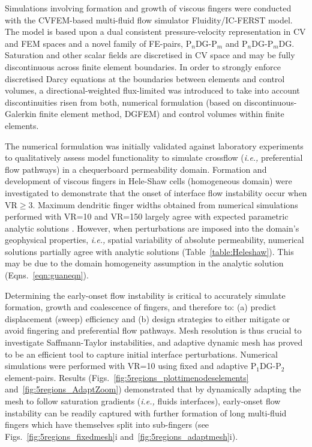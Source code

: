 \documentclass[preprint,authoryear,12pt]{elsarticle}
\newcommand{\PN}[2][error]{P$_{#1}$DG-P$_{#2}$}
\newcommand{\PNDG}[2][error]{P$_{#1}$DG-P$_{#2}$DG}
\newcommand{\ie}{{\it i.e., }}
\begin{document}
Simulations involving formation and growth of viscous fingers were conducted with the CVFEM-based multi-fluid flow simulator Fluidity/IC-FERST model. The model is based upon a dual consistent pressure-velocity representation in CV and FEM spaces and a novel family of FE-pairs, \PN[n]{m} and \PNDG[n]{m}. Saturation and other scalar fields are discretised in CV space and may be fully discontinuous across finite element boundaries. In order to strongly enforce discretised Darcy equations at the boundaries between elements and control volumes, a directional-weighted flux-limited was introduced to take into account discontinuities risen from both, numerical formulation (based on discontinuous-Galerkin finite element method, DGFEM) and control volumes within finite elements.

The numerical formulation was initially validated against laboratory experiments \citep{dawe_2008} to qualitatively assess model functionality to simulate crossflow (\ie preferential flow pathways) in a chequerboard permeability domain. Formation and development of viscous fingers in Hele-Shaw cells (homogeneous domain) were investigated to demonstrate that the onset of interface flow instability occur when VR$\ge$3. Maximum dendritic finger widths obtained from numerical simulations performed with VR=10 and VR=150 largely agree with expected parametric analytic solutions \citep{mclean_1981,guan_2003}. However, when perturbations are imposed into the domain's geophysical properties, \ie spatial variability of absolute permeability, numerical solutions partially agree with analytic solutions (Table~\ref{table:Heleshaw}). This may be due to the domain homogeneity assumption in the analytic solution (Eqns.~\ref {eqn:guaneqn}).

Determining the early-onset flow instability is critical to accurately simulate formation, growth and coalescence of fingers, and therefore to: (a) predict displacement (sweep) efficiency and (b) design strategies to either mitigate or avoid fingering and preferential flow pathways. Mesh resolution is thus crucial to investigate Saffmann-Taylor instabilities, and adaptive dynamic mesh has proved to be an efficient tool to capture initial interface perturbations. Numerical simulations were performed with VR=10 using fixed and adaptive \PN[1]{2} element-pairs. Results (Figs.~\ref{fig:5regions_plottimenodeselements} and~\ref{fig:5regions_AdaptZoom}) demonstrated that by dynamically adapting the mesh to follow saturation gradients (\ie fluids interfaces), early-onset flow instability can be readily captured with further formation of long multi-fluid fingers which have themselves split into sub-fingers (see Figs.~\ref{fig:5regions_fixedmesh}i and~\ref{fig:5regions_adaptmesh}i).
\end{document}
